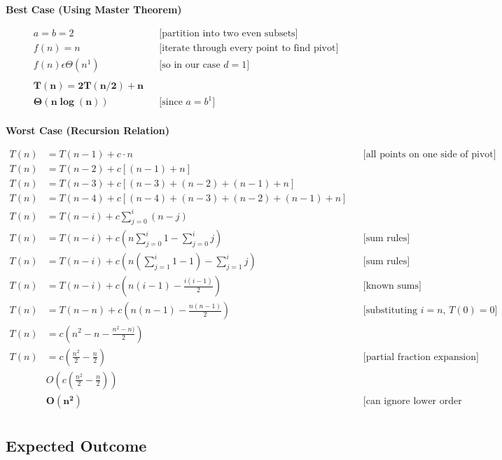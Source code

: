 \documentclass{article}
\begin{document}
{\textbf{Best Case (Using Master Theorem)}
\begin{center}
  \begin{align*}
    &a = b = 2 &&\text{[partition into two even subsets]} \\
    &f(n) = n &&\text{[iterate through every point to find pivot]} \\
    &f(n) \epsilon \Theta(n^1) &&\text{[so in our case $d=1$]} \\\\
    &\bm{T(n) = 2T(n/2) + n} \\
    &\bm{\Theta(n\log(n))} &&\text{[since $a=b^1$]} \\
  \end{align*}
\end{center}
\textbf{Worst Case (Recursion Relation)} 
\begin{center}
  \begin{align*}
    T(n) &= T(n-1) + c\cdot n &&\text{[all points on one side of pivot]} \\
    T(n) &= T(n-2) + c[(n-1) + n] \\
    T(n) &= T(n-3) + c[(n-3) + (n-2) + (n-1) + n] \\
    T(n) &= T(n-4) + c[(n-4) + (n-3) + (n-2) + (n-1) + n] \\
    T(n) &= T(n-i) + c\sum\limits_{j=0}^i (n-j) \\ 
    T(n) &= T(n-i) + c(n\sum\limits_{j=0}^i1 - \sum\limits_{j=0}^i j) &&\text{[sum rules]}\\ 
    T(n) &= T(n-i) + c(n(\sum\limits_{j=1}^i1 - 1)  - \sum\limits_{j=1}^i j) &&\text{[sum rules]}\\ 
    T(n) &= T(n-i) + c(n(i - 1)  - \frac{i(i-1)}{2}) &&\text{[known sums]}\\ 
    T(n) &= T(n-n) + c(n(n - 1)  - \frac{n(n-1)}{2}) &&\text{[substituting $i=n$, $T(0)=0$]}\\ 
    T(n) &= c(n^2 - n  - \frac{n^2-n)}{2}) \\ 
    T(n) &= c(\frac{n^2}{2} - \frac{n}{2}) &&\text{[partial fraction expansion]}\\ 
         &O(c(\frac{n^2}{2} - \frac{n}{2})) \\
         &\bm{O(n^2)} &&\text{[can ignore lower order terms/constants]} \\
  \end{align*}
\end{center}

  \subsection{Expected Outcome}
}
\end{document}
